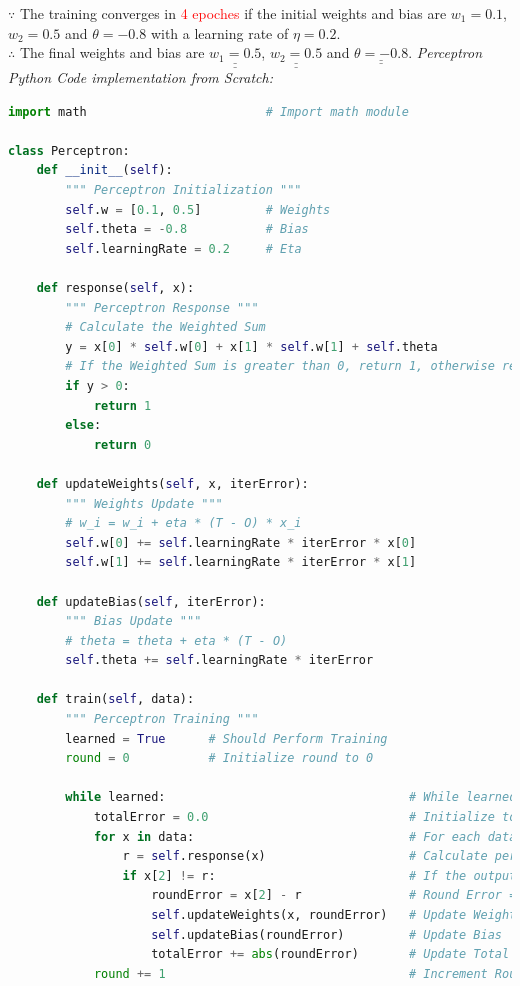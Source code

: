 \documentclass{book}
\begin{document}
$\because$ The training converges in \textcolor{red}{4 epoches} if the initial weights and bias are \(w_1 = 0.1\), \(w_2 = 0.5\) and \(\theta = -0.8\) with a learning rate of \(\eta = 0.2\).\\
$\therefore$ The final weights and bias are \(\underline{\underline{w_1 = 0.5}}\), \(\underline{\underline{w_2 = 0.5}}\) and \(\underline{\underline{\theta = -0.8}}\).
\newpage
\textit{\large{Perceptron Python Code implementation from Scratch:}}
\begin{lstlisting}[language=Python, basicstyle=\ttfamily\small, keywordstyle=\color{blue}, commentstyle=\color{forestgreen}, stringstyle=\color{red}, showstringspaces=false] 
import math                         # Import math module

class Perceptron:
    def __init__(self):
        """ Perceptron Initialization """
        self.w = [0.1, 0.5]         # Weights
        self.theta = -0.8           # Bias
        self.learningRate = 0.2     # Eta 
    
    def response(self, x):
        """ Perceptron Response """
        # Calculate the Weighted Sum
        y = x[0] * self.w[0] + x[1] * self.w[1] + self.theta
        # If the Weighted Sum is greater than 0, return 1, otherwise return 0
        if y > 0:
            return 1
        else:
            return 0

    def updateWeights(self, x, iterError):
        """ Weights Update """
        # w_i = w_i + eta * (T - O) * x_i
        self.w[0] += self.learningRate * iterError * x[0]
        self.w[1] += self.learningRate * iterError * x[1]

    def updateBias(self, iterError):
        """ Bias Update """
        # theta = theta + eta * (T - O)
        self.theta += self.learningRate * iterError

    def train(self, data):
        """ Perceptron Training """
        learned = True      # Should Perform Training
        round = 0           # Initialize round to 0
    
        while learned:                                  # While learned is true
            totalError = 0.0                            # Initialize totalError to 0
            for x in data:                              # For each data in the dataset
                r = self.response(x)                    # Calculate perceptron output of X
                if x[2] != r:                           # If the output is different from the target
                    roundError = x[2] - r               # Round Error = Target- Perceptron Output
                    self.updateWeights(x, roundError)   # Update Weights
                    self.updateBias(roundError)         # Update Bias
                    totalError += abs(roundError)       # Update Total Error
            round += 1                                  # Increment Round
            

\end{lstlisting}
\end{document}
